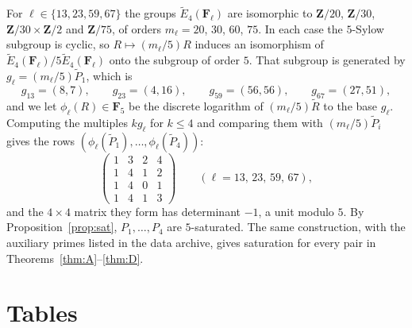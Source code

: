 \documentclass[11pt]{amsart}
\theoremstyle{definition}
\newcommand{\Z}{\mathbf{Z}}
\newcommand{\F}{\mathbf{F}}
\begin{document}
For $\ell\in\{13,23,59,67\}$ the groups $\tilde E_4(\F_\ell)$ are isomorphic to $\Z/20$, $\Z/30$, $\Z/30\times\Z/2$ and $\Z/75$, of orders $m_\ell=20$, $30$, $60$, $75$. In each case the $5$-Sylow subgroup is cyclic, so $R\mapsto(m_\ell/5)R$ induces an isomorphism of $\tilde E_4(\F_\ell)/5\tilde E_4(\F_\ell)$ onto the subgroup of order $5$. That subgroup is generated by $g_\ell=(m_\ell/5)\tilde P_1$, which is
\[
g_{13}=(8,7),\qquad g_{23}=(4,16),\qquad g_{59}=(56,56),\qquad g_{67}=(27,51),
\]
and we let $\phi_\ell(R)\in\F_5$ be the discrete logarithm of $(m_\ell/5)\tilde R$ to the base $g_\ell$. Computing the multiples $k g_\ell$ for $k\le4$ and comparing them with $(m_\ell/5)\tilde P_i$ gives the rows $(\phi_\ell(\tilde P_1),\dots,\phi_\ell(\tilde P_4))$:
\[
\begin{pmatrix}1&3&2&4\\1&4&1&2\\1&4&0&1\\1&4&1&3\end{pmatrix}\qquad(\ell=13,\,23,\,59,\,67),
\]
and the $4\times4$ matrix they form has determinant $-1$, a unit modulo $5$. By Proposition~\ref{prop:sat}, $P_1,\dots,P_4$ are $5$-saturated. The same construction, with the auxiliary primes listed in the data archive, gives saturation for every pair in Theorems~\ref{thm:A}--\ref{thm:D}.

\section{Tables}\label{app:tables}

\begin{table}[htbp]
\centering\small
\caption{$E_4$: for each good ordinary prime $5\le p<1000$, the residue of $a_4$ modulo $p$ (modulo $p^2$ for $p=7,157$) and the surjectivity witness $(q_1,q_2,q_3)$ of Proposition~\ref{prop:surj}. In every case $v_p(S_p)=0$ except at $7$ and $157$, where $v_p(S_p)=1$.}\label{tab:rank4}
\footnotesize

\end{table}

\begin{table}[htbp]
\centering\small
\caption{The $45$ rank-three pairs with $v_p(S_p)\ge2$, with $a_3$ modulo $p^{v_p(S_p)+1}$. In each case $v_p(a_3)=v_p(S_p)$ and the leading digit of $a_3$ is that of $S_p$.}\label{tab:deep}

\end{table}

\begin{table}[htbp]
\centering\small
\caption{The rank-three pairs of Theorem~\ref{thm:B} by prime: the number of pairs, their distribution by $v=v_p(S_p)$, the number with $a_p\equiv1\pmod p$ (anomalous), and $p$ times the proportion of irregular pairs. The level at which a pair is settled is $v+2$.}\label{tab:primes}

\end{table}
\end{document}
